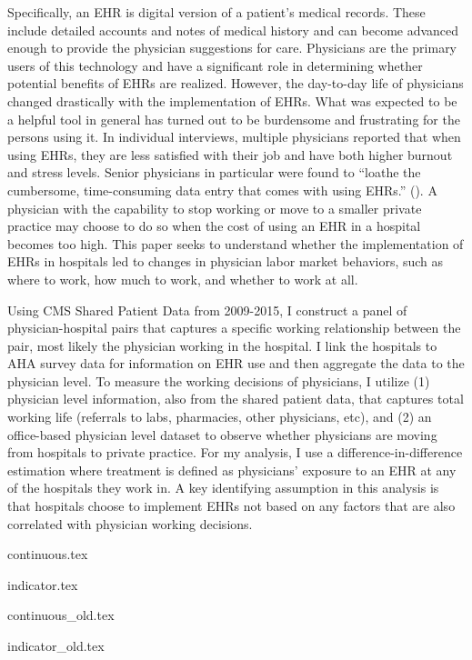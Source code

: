 \documentclass[11pt]{article}
\begin{document}
Specifically, an EHR is digital version of a patient’s medical records. These include detailed accounts and notes of medical history and can become advanced enough to provide the physician suggestions for care. Physicians are the primary users of this technology and have a significant role in determining whether potential benefits of EHRs are realized. However, the day-to-day life of physicians changed drastically with the implementation of EHRs. What was expected to be a helpful tool in general has turned out to be burdensome and frustrating for the persons using it. In individual interviews, multiple physicians reported that when using EHRs, they are less satisfied with their job and have both higher burnout and stress levels. Senior physicians in particular were found to “loathe the cumbersome, time-consuming data entry that comes with using EHRs.” (\cite{CollierBurnout}). A physician with the capability to stop working or move to a smaller private practice may choose to do so when the cost of using an EHR in a hospital becomes too high. This paper seeks to understand whether the implementation of EHRs in hospitals led to changes in physician labor market behaviors, such as where to work, how much to work, and whether to work at all.

Using CMS Shared Patient Data from 2009-2015, I construct a panel of physician-hospital pairs that captures a specific working relationship between the pair, most likely the physician working in the hospital. I link the hospitals to AHA survey data for information on EHR use and then aggregate the data to the physician level. To measure the working decisions of physicians, I utilize (1) physician level information, also from the shared patient data, that captures total working life (referrals to labs, pharmacies, other physicians, etc), and (2) an office-based physician level dataset to observe whether physicians are moving from hospitals to private practice. For my analysis, I use a difference-in-difference estimation where treatment is defined as physicians' exposure to an EHR at any of the hospitals they work in. A key identifying assumption in this analysis is that hospitals choose to implement EHRs not based on any factors that are also correlated with physician working decisions.  


\newpage

{continuous.tex}

\newpage

{indicator.tex}

\newpage

{continuous_old.tex}

\newpage

{indicator_old.tex}

\newpage
\end{document}
